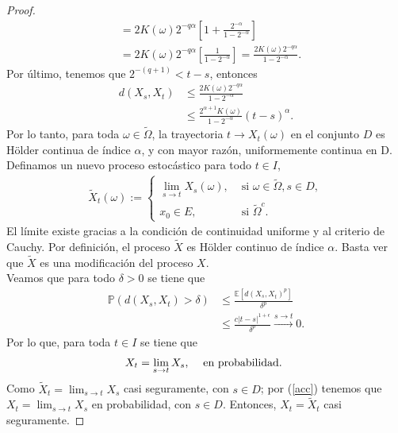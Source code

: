 \begin{proof}
\begin{align*}
	& = 2K(\omega) 2^{-q \alpha} \left[1 + \frac{2^{- \alpha}}{1 - 2^{- \alpha}} \right] \\
	& = 2K(\omega) 2^{-q \alpha} \left[ \frac{1}{1 - 2^{- \alpha}} \right] = \frac{2K(\omega) 2^{-q \alpha}}{1 - 2^{- \alpha}}.
	\end{align*}
Por último, tenemos que $2^{-(q+1)} < t-s$, entonces
	\begin{align*}
	d(X_s, X_t) & \leq \frac{2K(\omega) 2^{-q \alpha}}{1 - 2^{- \alpha}} \\
	& \leq \frac{2^{\alpha + 1}K(\omega)}{1 - 2^{- \alpha}} (t - s)^{\alpha}.
	\end{align*}
Por lo tanto, para toda $\omega \in \tilde{\Omega}$, la trayectoria $t \rightarrow X_t (\omega)$ en el conjunto $D$ es Hölder continua de índice $\alpha$, y con mayor razón, uniformemente continua en D. \\

Definamos un nuevo proceso estocástico para todo $t \in I$, 
	\begin{align*}
	\tilde{X}_t (\omega) := 
		\begin{cases}
		\lim_{s \rightarrow t} X_s (\omega), & \text{ si } \omega \in \tilde{\Omega}, s \in D, \\
		x_0 \in E, & \text{ si } \tilde{\Omega}^c .
		\end{cases}
	\end{align*}
El límite existe gracias a la condición de continuidad uniforme y al criterio de Cauchy. Por definición, el proceso $\tilde{X}$ es Hölder continuo de índice $\alpha$. Basta ver que $\tilde{X}$ es una modificación del proceso $X$. \\

Veamos que para todo $\delta > 0$ se tiene que
	\begin{align*}
	\mathbb{P} \left(d(X_s, X_t) > \delta \right) & \leq \frac{\mathbb{E} [d(X_s, X_t)^p]}{\delta^p} \\
	& \leq \frac{c|t-s|^{1+ \epsilon}}{\delta^p} \xrightarrow{s \rightarrow t} 0.
	\end{align*}
Por lo que, para toda $t \in I$ se tiene que
	\begin{align}
	X_t = \lim_{s \rightarrow t} X_s, \hspace{0.3cm} \text{ en probabilidad. } \label{acc}
	\end{align}
Como $\tilde{X}_t = \lim_{s \rightarrow t} X_s$ casi seguramente, con $s \in D$; por (\ref{acc}) tenemos que $X_t = \lim_{s \rightarrow t} X_s$ en probabilidad, con $s \in D$. Entonces, $X_t = \tilde{X}_t$ casi seguramente.
\end{proof}


